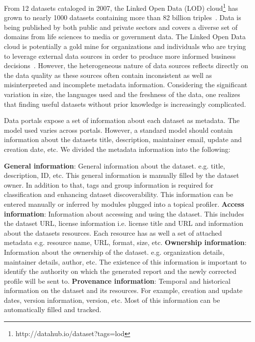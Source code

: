 \documentclass[runningheads,a4paper]{llncs}
\begin{document}
From 12 datasets cataloged in 2007, the Linked Open Data (LOD) cloud\footnote{http://datahub.io/dataset?tags=lod} has grown to nearly 1000 datasets containing more than 82 billion triples~\cite{BizerHeath2009}. Data is being published by both public and private sectors and covers a diverse set of domains from life sciences to media or government data. The Linked Open Data cloud is potentially a gold mine for organizations and individuals who are trying to leverage external data sources in order to produce more informed business decisions~\cite{Boyd2011}. However, the heterogeneous nature of data sources reflects directly on the data quality as these sources often contain inconsistent as well as misinterpreted and incomplete metadata information. Considering the significant variation in size, the languages used and the freshness of the data, one realizes that finding useful datasets without prior knowledge is increasingly complicated.

Data portals expose a set of information about each dataset as metadata. The model used varies across portals. However, a standard model should contain information about the datasets title, description, maintainer email, update and creation date, etc. We divided the metadata information into the following:

\textbf{General information}: General information about the dataset. e.g. title, description, ID, etc. This general information is manually filled by the dataset owner. In addition to that, tags and group information is required for classification and enhancing dataset discoverability. This information can be entered manually or inferred by modules plugged into a topical profiler.
\textbf{Access information}: Information about accessing and using the dataset. This includes the dataset URL, license information i.e. license title and URL and information about the datasets resources. Each resource has as well a set of attached metadata e.g. resource name, URL, format, size, etc.
\textbf{Ownership information}: Information about the ownership of the dataset. e.g. organization details, maintainer details, author, etc. The existence of this information is important to identify the authority on which the generated report and the newly corrected profile will be sent to.
\textbf{Provenance information}: Temporal and historical information on the dataset and its resources. For example, creation and update dates, version information, version, etc. Most of this information can be automatically filled and tracked.
\end{document}
